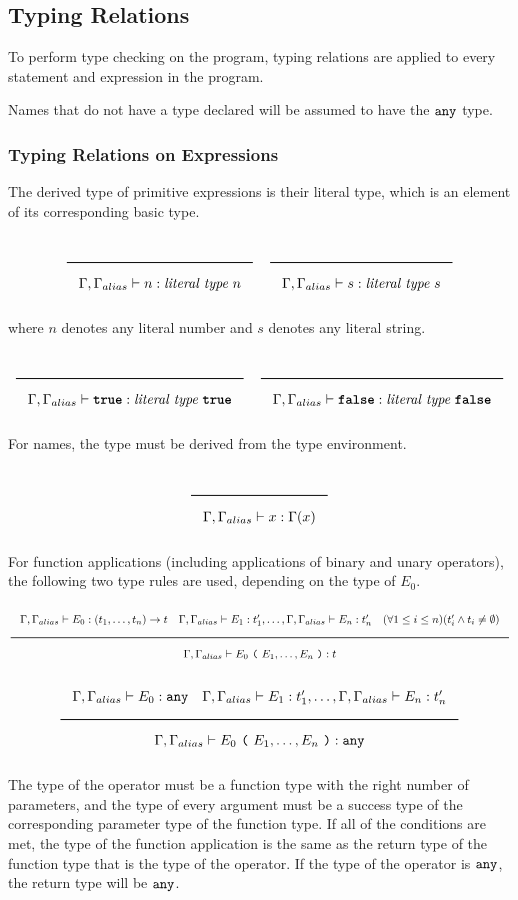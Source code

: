 \subsection{Typing Relations}
\label{typing-rules}

To perform type checking on the program, typing relations are applied to every statement and expression in the program.

Names that do not have a type declared will be assumed to have the $\texttt{any}$ type.

\subsubsection{Typing Relations on Expressions}

The derived type of primitive expressions is their literal type, which is an element of its corresponding basic type.

\noindent
\[
  \Rule{}{\Gamma, \Gamma_{alias} \vdash n : \textit{literal type}\ n}
  \quad
  \Rule{}{\Gamma, \Gamma_{alias} \vdash s : \textit{literal type}\ s}
\]
\noindent

where $n$ denotes any literal number and $s$ denotes any literal string.

\noindent
\[
  \Rule{}{\Gamma, \Gamma_{alias} \vdash \TruE : \textit{literal type}\ \TruE}
  \quad
  \Rule{}{\Gamma, \Gamma_{alias} \vdash \FalsE : \textit{literal type}\ \FalsE}
\]
\noindent

For names, the type must be derived from the type environment.

\noindent
\[
  \Rule{}{\Gamma, \Gamma_{alias} \vdash x : \Gamma(x)}
\]
\noindent

For function applications (including applications of binary and unary operators), the following two type rules are used, depending on the type of $E_0$.

\noindent
\[
\Rule{\Gamma, \Gamma_{alias} \vdash E_0 : (t_1, \ldots, t_n) \rightarrow t \quad \Gamma, \Gamma_{alias} \vdash E_1 : t'_1, \ldots,  \Gamma, \Gamma_{alias} \vdash E_n : t'_n
  \quad (\forall 1 \leq i \leq n)(t'_i \wedge t_i \neq \emptyset)}{\Gamma, \Gamma_{alias} \vdash E_0\ \Lp \ E_1, \ldots, E_n\ \Rp : t}
\]
\noindent
\[
  \Rule{\Gamma, \Gamma_{alias} \vdash E_0 : \Any \quad \Gamma, \Gamma_{alias} \vdash E_1 : t'_1, \ldots, \Gamma, \Gamma_{alias} \vdash E_n : t'_n
    }{\Gamma, \Gamma_{alias} \vdash E_0\ \Lp \ E_1, \ldots, E_n\ \Rp : \Any}
\]
\noindent

The type of the operator must be a function type with the right number of parameters,
and the type of every argument must be a success type of the corresponding parameter type of the function type.
If all of the conditions are met, the type of the function application is the same
as the return type of the function type that is the type of the operator.
If the type of the operator is $\texttt{any}$, the return type will be $\texttt{any}$.

